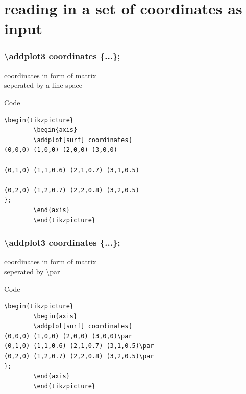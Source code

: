 \documentclass{beamer}
\begin{document}
\section{reading in a set of coordinates as input}
\begin{frame}[fragile]
   \frametitle{\color{blue}\textbackslash addplot3 coordinates \color{black} \{...\};}
   coordinates in form of matrix\\
   seperated by a line space\\
\begin{block}{Code}
\begin{verbatim}
\begin{tikzpicture}
		\begin{axis}
		\addplot[surf] coordinates{
(0,0,0) (1,0,0) (2,0,0) (3,0,0)

(0,1,0) (1,1,0.6) (2,1,0.7) (3,1,0.5)

(0,2,0) (1,2,0.7) (2,2,0.8) (3,2,0.5)
};	
		\end{axis}
		\end{tikzpicture}
\end{verbatim}
\end{block}
\end{frame}
\begin{frame}[fragile]
   \frametitle{\color{blue}\textbackslash addplot3 coordinates \color{black} \{...\};}
   coordinates in form of matrix\\
   seperated by \color{blue} \textbackslash par\\
\begin{block}{Code}
\begin{verbatim}
\begin{tikzpicture}
		\begin{axis}
		\addplot[surf] coordinates{
(0,0,0) (1,0,0) (2,0,0) (3,0,0)\par
(0,1,0) (1,1,0.6) (2,1,0.7) (3,1,0.5)\par
(0,2,0) (1,2,0.7) (2,2,0.8) (3,2,0.5)\par
};	
		\end{axis}
		\end{tikzpicture}
\end{verbatim}
\end{block}
\end{frame}   
\end{document}
